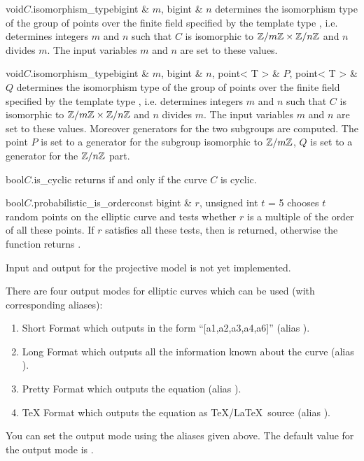 \begin{fcode}{void}{$C$.isomorphism_type}{bigint & $m$, bigint & $n$}
  determines the isomorphism type of the group of points over the finite field specified by the
  template type , i.e. determines integers $m$ and $n$ such that $C$ is isomorphic to
  $\mathbb{Z}/m\mathbb{Z} \times \mathbb{Z}/n\mathbb{Z}$ and $n$ divides $m$.  The input variables $m$ and $n$ are set to these
  values.
\end{fcode}

\begin{fcode}{void}{$C$.isomorphism_type}{bigint & $m$, bigint & $n$,
    point< T > & $P$, point< T > & $Q$}%
  determines the isomorphism type of the group of points over the finite field specified by the
  template type , i.e. determines integers $m$ and $n$ such that $C$ is isomorphic to
  $\mathbb{Z}/m\mathbb{Z} \times \mathbb{Z}/n\mathbb{Z}$ and $n$ divides $m$.  The input variables $m$ and $n$ are set to these
  values.  Moreover generators for the two subgroups are computed.  The point $P$ is set to a
  generator for the subgroup isomorphic to $\mathbb{Z}/m\mathbb{Z}$, $Q$ is set to a generator for the $\mathbb{Z}/n\mathbb{Z}$
  part.
\end{fcode}

\begin{fcode}{bool}{$C$.is_cyclic}{}
  returns \TRUE if and only if the curve $C$ is cyclic.
\end{fcode}

\begin{fcode}{bool}{$C$.probabilistic_is_order}{const bigint & $r$, unsigned int $t$ = 5}
  chooses $t$ random points on the elliptic curve and tests whether $r$ is a multiple of the
  order of all these points.  If $r$ satisfies all these tests, then \TRUE is returned,
  otherwise the function returns \FALSE.
\end{fcode}



\IO

Input and output for the projective model is not yet implemented.

There are four output modes for elliptic curves which can be used (with corresponding aliases):
\begin {enumerate}
\item[(0)] Short Format which outputs in the form ``[a1,a2,a3,a4,a6]'' (alias ).
\item[(1)] Long Format which outputs all the information known about the curve (alias
  ).
\item[(2)] Pretty Format which outputs the equation (alias ).
\item[(3)] TeX Format which outputs the equation as \TeX/\LaTeX\ source (alias ).
\end {enumerate}
You can set the output mode using the aliases given above.  The default value for the output
mode is .

